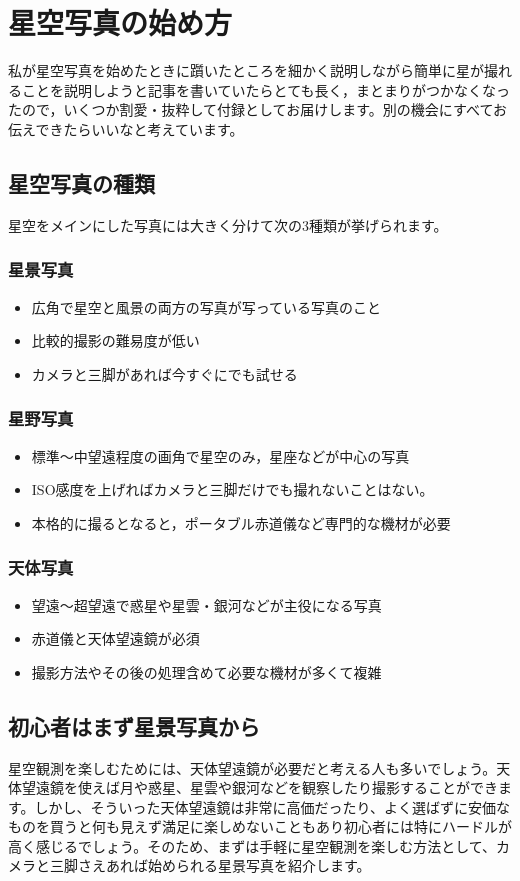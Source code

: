 \documentclass[supernova_2023]{subfiles}
\begin{document}
\chapter{星空写真の始め方}
私が星空写真を始めたときに躓いたところを細かく説明しながら簡単に星が撮れることを説明しようと記事を書いていたらとても長く，まとまりがつかなくなったので，いくつか割愛・抜粋して付録としてお届けします。別の機会にすべてお伝えできたらいいなと考えています。
\section{星空写真の種類}
星空をメインにした写真には大きく分けて次の3種類が挙げられます。
\subsection{星景写真}
\begin{itemize}
  \item 広角で星空と風景の両方の写真が写っている写真のこと
  \item 比較的撮影の難易度が低い
  \item カメラと三脚があれば今すぐにでも試せる
\end{itemize}
\subsection{星野写真}
\begin{itemize}
  \item 標準～中望遠程度の画角で星空のみ，星座などが中心の写真
  \item ISO感度を上げればカメラと三脚だけでも撮れないことはない。
  \item 本格的に撮るとなると，ポータブル赤道儀など専門的な機材が必要
\end{itemize}
\subsection{天体写真}
\begin{itemize}
  \item 望遠～超望遠で惑星や星雲・銀河などが主役になる写真
  \item 赤道儀と天体望遠鏡が必須
  \item 撮影方法やその後の処理含めて必要な機材が多くて複雑
\end{itemize}
\section{初心者はまず星景写真から}
星空観測を楽しむためには、天体望遠鏡が必要だと考える人も多いでしょう。天体望遠鏡を使えば月や惑星、星雲や銀河などを観察したり撮影することができます。しかし、そういった天体望遠鏡は非常に高価だったり、よく選ばずに安価なものを買うと何も見えず満足に楽しめないこともあり初心者には特にハードルが高く感じるでしょう。そのため、まずは手軽に星空観測を楽しむ方法として、カメラと三脚さえあれば始められる星景写真を紹介します。
\end{document}

